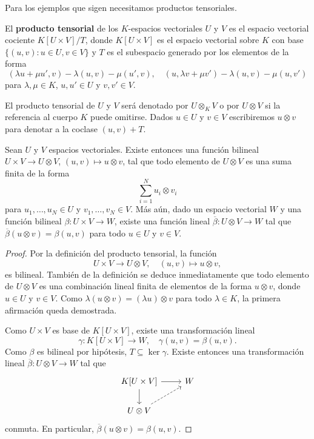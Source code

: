 Para los ejemplos que sigen 
necesitamos productos tensoriales. 

El \textbf{producto tensorial} de los $K$-espacios vectoriales $U$ y $V$ es
el espacio vectorial cociente $K[U\times V]/T$, donde $K[U\times V]$ es el
espacio vectorial sobre $K$ con base $\{(u,v):u\in U,v\in V\}$ y $T$ es el subespacio
generado por los elementos de la forma
	\[
		(\lambda u+\mu u',v)-\lambda(u,v)-\mu(u',v),\quad
		(u,\lambda v+\mu v')-\lambda(u,v)-\mu(u,v')
	\]
	para $\lambda,\mu\in K$, $u,u'\in U$ y $v,v'\in V$.

El producto tensorial de $U$ y $V$ será denotado por $U\otimes_KV$ o por
$U\otimes V$ si la referencia al cuerpo $K$ puede omitirse. Dados $u\in U$
y $v\in V$ escribiremos $u\otimes v$ para denotar a la coclase $(u,v)+T$.

\begin{theorem}
	Sean $U$ y $V$ espacios vectoriales.  Existe entonces una función bilineal
	$U\times V\to U\otimes V$, $(u,v)\mapsto u\otimes v$, tal que todo
	elemento de $U\otimes V$ es una suma finita de la forma
	\[
		\sum_{i=1}^N u_i\otimes v_i
	\]
	para $u_1,\dots,u_N\in U$ y $v_1,\dots,v_N\in V$. 
	Más aún, dado un espacio vectorial $W$ y una función
	bilineal $\beta\colon U\times V\to W$, existe una función lineal
	$\overline{\beta}\colon U\otimes V\to W$ tal que $\overline{\beta}(u\otimes
	v)=\beta(u,v)$ para todo $u\in U$ y $v\in V$.
\end{theorem}

\begin{proof}
	Por la definición del producto tensorial, la función 
	\[
	U\times V\to U\otimes V,\quad
	(u,v)\mapsto u\otimes v,
	\]
	es bilineal. También de la definición se deduce inmediatamente que todo
	elemento de $U\otimes V$ es una combinación lineal finita de elementos de
	la forma $u\otimes v$, donde $u\in U$ y $v\in V$. Como $\lambda(u\otimes
	v)=(\lambda u)\otimes v$ para todo $\lambda\in K$, la primera afirmación
	queda demostrada.

	Como $U\times V$ es base de $K[U\times V]$, existe una transformación lineal 
	\[
		\gamma\colon K[U\times V]\to W,\quad
	\gamma(u,v)=\beta(u,v). 
	\]
	Como $\beta$ es bilineal por hipótesis, $T\subseteq\ker\gamma$. Existe
	entonces una transformación lineal $\overline{\beta}\colon U\otimes V\to
	W$ tal que 
	\[
	\begin{tikzcd}
		K[U\times V] \arrow[r]\arrow[d] & W \\
		U\otimes V\arrow[ur, dashrightarrow]
	\end{tikzcd}
	\]
	conmuta. En particular, $\overline{\beta}(u\otimes v)=\beta(u,v)$. 
\end{proof}

